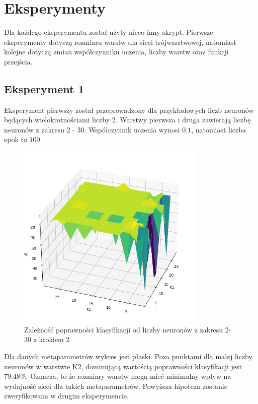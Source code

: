\documentclass{article}
\begin{document}
\newpage
\section{Eksperymenty}
Dla każdego eksperymentu został użyty nieco inny skrypt.
Pierwsze eksperymenty dotyczą rozmiaru warstw dla sieci trójwarstwowej, natomiast kolejne dotyczą zmian współczynniku uczenia, liczby warstw oraz funkcji przejścia.
\subsection{Eksperyment 1}

Eksperyment pierwszy został przeprowadzony dla przykładowych liczb neuronów będących wielokrotnościami liczby 2.
Warstwy pierwsza i druga zawierają liczbę neuronów z zakresu 2 - 30.
Współczynnik uczenia wynosi $0.1$, natomiast liczba epok to $100$.

\begin{figure}[H]
    \centering
    \includegraphics[width=0.8\textwidth, keepaspectratio]{k1_k2_1.png}
    \caption{Zależność poprawności klasyfikacji od liczby neuronów z zakresu 2-30 z krokiem 2}
    \label{fig:k1k2_1}
\end{figure}

Dla danych metaparametrów wykres jest płaski.
Poza punktami dla małej liczby neuronów w warstwie K2, dominującą wartością poprawności klasyfikacji jest $79.48\%$.
Oznacza, to że rozmiary warstw mogą mieć minimalny wpływ na wydajność sieci dla takich metaparametrów.
Powyższa hipoteza zostanie zweryfikowana w drugim eksperymencie.
\end{document}

